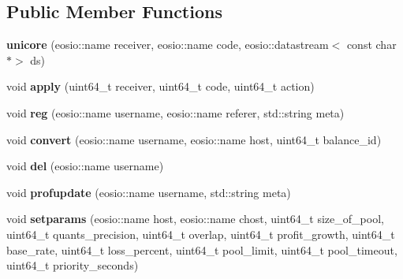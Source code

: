 \subsection*{Public Member Functions}
\begin{DoxyCompactItemize}
\item 
\mbox{\label{classeosio_1_1unicore_a6f8aab7d944e62d87dd03562f5ed76a7}} 
{\bfseries unicore} (eosio\+::name receiver, eosio\+::name code, eosio\+::datastream$<$ const char $\ast$$>$ ds)
\item 
\mbox{\label{classeosio_1_1unicore_a59303f0f27f097d80749a7dd0fc084ef}} 
void {\bfseries apply} (uint64\+\_\+t receiver, uint64\+\_\+t code, uint64\+\_\+t action)
\item 
\mbox{\label{classeosio_1_1unicore_a2fdc7827418ab30d2216986a333bc584}} 
void {\bfseries reg} (eosio\+::name username, eosio\+::name referer, std\+::string meta)
\item 
\mbox{\label{classeosio_1_1unicore_a8a39c3fdbe0d6a386452d1c1f9bd3f27}} 
void {\bfseries convert} (eosio\+::name username, eosio\+::name host, uint64\+\_\+t balance\+\_\+id)
\item 
\mbox{\label{classeosio_1_1unicore_ae88e86032e06550d4765ce4bcfa5a2dc}} 
void {\bfseries del} (eosio\+::name username)
\item 
\mbox{\label{classeosio_1_1unicore_ae73abdf51c2e57c5068bb176a67ca846}} 
void {\bfseries profupdate} (eosio\+::name username, std\+::string meta)
\item 
\mbox{\label{classeosio_1_1unicore_ac4def2358ff27c9454fcbbb71163f300}} 
void {\bfseries setparams} (eosio\+::name host, eosio\+::name chost, uint64\+\_\+t size\+\_\+of\+\_\+pool, uint64\+\_\+t quants\+\_\+precision, uint64\+\_\+t overlap, uint64\+\_\+t profit\+\_\+growth, uint64\+\_\+t base\+\_\+rate, uint64\+\_\+t loss\+\_\+percent, uint64\+\_\+t pool\+\_\+limit, uint64\+\_\+t pool\+\_\+timeout, uint64\+\_\+t priority\+\_\+seconds)
\item 
\mbox{\label{classeosio_1_1unicore_a6d49834320bcf0133e9399a3b45ac3e5}} 
$$
\end{DoxyCompactItemize}
